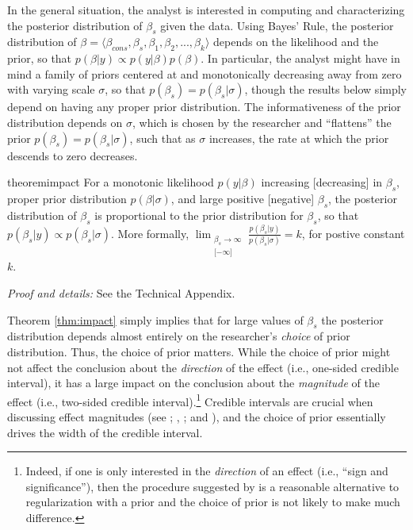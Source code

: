 \documentclass[12pt]{article}
\begin{document}
In the general situation, the analyst is interested in computing and characterizing the posterior distribution of $\beta_s$ given the data. Using Bayes' Rule, the posterior distribution of $\beta = \langle \beta_{cons}, \beta_{s}, \beta_1, \beta_2, ..., \beta_k \rangle$ depends on the likelihood and the prior, so that $p(\beta | y) \propto p(y|\beta)p(\beta)$. In particular, the analyst might have in mind a family of priors centered at and monotonically decreasing away from zero with varying scale $\sigma$, so that $p(\beta_s) = p(\beta_s | \sigma)$, though the results below simply depend on having any proper prior distribution. The informativeness of the prior distribution depends on $\sigma$, which is chosen by the researcher and ``flattens'' the prior $p(\beta_s) = p(\beta_s | \sigma)$, such that as $\sigma$ increases, the rate at which the prior descends to zero decreases.

\begin{restatable}{theorem}{impact}\label{thm:impact}
For a monotonic likelihood $p(y | \beta)$ increasing [decreasing] in $\beta_s$, proper prior distribution $p(\beta | \sigma)$, and large positive [negative] $\beta_s$, the posterior distribution of $\beta_s$ is proportional to the prior distribution for $\beta_s$, so that $p(\beta_s | y) \propto p(\beta_s | \sigma)$. More formally, $\displaystyle \lim _{\substack{\beta_s \to \infty\\ \lbrack -\infty \rbrack}} \frac{p(\beta_s | y)}{p(\beta_s | \sigma)} = k$, for postive constant $k$.
\end{restatable}

\noindent \textit{Proof and details:} See the Technical Appendix.

Theorem \ref{thm:impact} simply implies that for large values of $\beta_s$ the posterior distribution depends almost entirely on the researcher's \emph{choice} of prior distribution. Thus, the choice of prior matters. While the choice of prior might not affect the conclusion about the \emph{direction} of the effect (i.e., one-sided credible interval), it has a large impact on the conclusion about the \emph{magnitude} of the effect (i.e., two-sided credible interval).\footnote{Indeed, if one is only interested in the \textit{direction} of an effect (i.e., ``sign and significance''), then the procedure suggested by \cite{Geyer2009} is a reasonable alternative to regularization with a prior and the choice of prior is not likely to make much difference.} Credible intervals are crucial when discussing effect magnitudes (see \citealt{KingTomzWittenberg2000}; \citealt{Rainey2014}, \citealt{Gross2014}; and \citealt{McCaskeyRainey2014}), and the choice of prior essentially drives the width of the credible interval.
\end{document}
